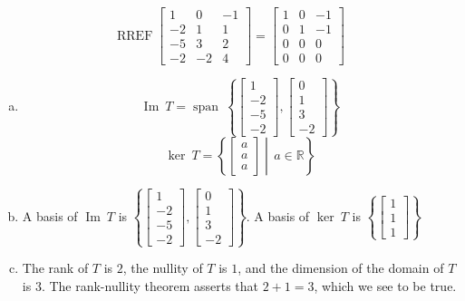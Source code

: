 \begin{exerciseAnswer} 


\[\operatorname{RREF} \left[\begin{array}{ccc}
1 & 0 & -1 \\
-2 & 1 & 1 \\
-5 & 3 & 2 \\
-2 & -2 & 4
\end{array}\right] = \left[\begin{array}{ccc}
1 & 0 & -1 \\
0 & 1 & -1 \\
0 & 0 & 0 \\
0 & 0 & 0
\end{array}\right] \]


\begin{enumerate}[(a)]
\item \[\operatorname{Im}\ T = \operatorname{span}\  \left\{ \left[\begin{array}{c}
1 \\
-2 \\
-5 \\
-2
\end{array}\right] , \left[\begin{array}{c}
0 \\
1 \\
3 \\
-2
\end{array}\right] \right\} \]\[\operatorname{ker}\ T =  \left\{ \left[\begin{array}{c}
a \\
a \\
a
\end{array}\right] \middle|\,a\in\mathbb{R}\right\} \]
\item  A basis of \(\operatorname{Im}\ T\) is \( \left\{ \left[\begin{array}{c}
1 \\
-2 \\
-5 \\
-2
\end{array}\right] , \left[\begin{array}{c}
0 \\
1 \\
3 \\
-2
\end{array}\right] \right\} \). A basis of \(\operatorname{ker}\ T\) is \( \left\{ \left[\begin{array}{c}
1 \\
1 \\
1
\end{array}\right] \right\} \)
\item  The rank of \(T\) is \( 2 \), the nullity of \(T\) is \( 1 \), and the dimension of the domain of \(T\) is \( 3 \). The rank-nullity theorem asserts that \( 2 + 1 = 3 \), which we see to be true. 
\end{enumerate}
    
\end{exerciseAnswer}
    
